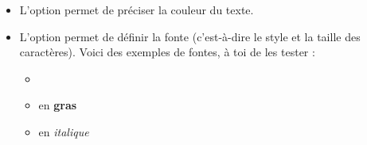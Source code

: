 \documentclass[11pt,class=report,crop=false]{standalone}
\begin{document}
\begin{cours}
\begin{itemize}
  \item L'option  permet de préciser la couleur du texte.
  
  \item L'option  permet de définir la fonte (c'est-à-dire le style et la taille des caractères). Voici des exemples de fontes, à toi de les tester :
  \begin{itemize}
    \item {} 
    \item {} en \textbf{gras}
    \item {} en \emph{italique}
  \end{itemize}  
\end{itemize}


\end{cours}


\end{document}
